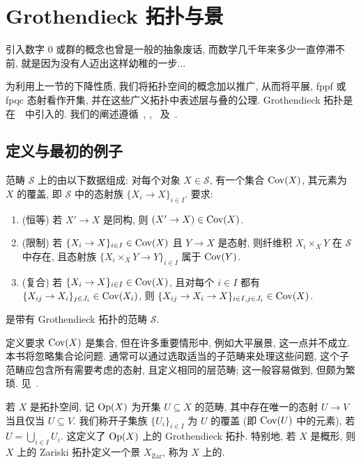 \section{Grothendieck 拓扑与景}\label{src:3.2}
\begin{epigraph}
引入数字 $0$ 或群的概念也曾是一般的抽象废话, 而数学几千年来多少一直停滞不前, 就是因为没有人迈出这样幼稚的一步...
\end{epigraph}
为利用上一节的下降性质, 我们将拓扑空间的概念加以推广, 从而将平展, fppf 或 fpqc 态射看作开集, 并在这些广义拓扑中表述层与叠的公理. Grothendieck 拓扑是在~\cite[定义 II.1.3]{SGA4}~中引入的. 我们的阐述遵循~\cite{Art62}, \cite{Vis05}, \cite[§2]{Ols16}~及~\cite[Tag 00UZ]{SP}.

\subsection{定义与最初的例子}\label{src:3.2.1-subsection}
\begin{definition}[景]\label{src:3.2.1}
范畴 $\mathcal S$ 上的由以下数据组成: 对每个对象 $X\in\mathcal S$, 有一个集合 $\operatorname{Cov}(X)$, 其元素为 $X$ 的覆盖, 即 $\mathcal S$ 中的态射族 $\{X_i\to X\}_{i\in I}$. 要求:
\begin{enumerate}[(1)]
\item (恒等) 若 $X'\to X$ 是同构, 则 $(X'\to X)\in\operatorname{Cov}(X)$.
\item (限制) 若 $\{X_i\to X\}_{i\in I}\in\operatorname{Cov}(X)$ 且 $Y\to X$ 是态射, 则纤维积 $X_i\times_X Y$ 在 $\mathcal S$ 中存在, 且态射族 $\{X_i\times_X Y\to Y\}_{i\in I}$ 属于 $\operatorname{Cov}(Y)$.
\item (复合) 若 $\{X_i\to X\}_{i\in I}\in\operatorname{Cov}(X)$, 且对每个 $i\in I$ 都有 $\{X_{ij}\to X_i\}_{j\in J_i}\in\operatorname{Cov}(X_i)$, 则 $\{X_{ij}\to X_i\to X\}_{i\in I,j\in J_i}\in\operatorname{Cov}(X)$.
\end{enumerate}
是带有 Grothendieck 拓扑的范畴 $\mathcal S$.
\end{definition}
\begin{caution}\label{src:3.2.2}
定义要求 $\operatorname{Cov}(X)$ 是集合, 但在许多重要情形中, 例如大平展景, 这一点并不成立. 本书将忽略集合论问题. 通常可以通过选取适当的子范畴来处理这些问题, 这个子范畴应包含所有需要考虑的态射, 且定义相同的层范畴; 这一般容易做到, 但颇为繁琐. 见~\cite[Tag 00VI]{SP}.
\end{caution}
\begin{example}[拓扑空间]\label{src:3.2.3}
若 $X$ 是拓扑空间, 记 $\operatorname{Op}(X)$ 为开集 $U\subseteq X$ 的范畴, 其中存在唯一的态射 $U\to V$ 当且仅当 $U\subseteq V$. 我们称开子集族 $\{U_i\}_{i\in I}$ 为 $U$ 的覆盖 (即 $\operatorname{Cov}(U)$ 中的元素), 若 $U=\bigcup_{i\in I}U_i$. 这定义了 $\operatorname{Op}(X)$ 上的 Grothendieck 拓扑. 特别地, 若 $X$ 是概形, 则 $X$ 上的 Zariski 拓扑定义一个景 $X_{\mathrm{Zar}}$, 称为 $X$ 上的.
\end{example}
